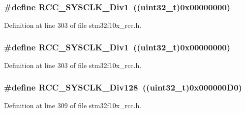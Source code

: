 \subsubsection[{\texorpdfstring{R\+C\+C\+\_\+\+S\+Y\+S\+C\+L\+K\+\_\+\+Div1}{RCC_SYSCLK_Div1}}]{\setlength{\rightskip}{0pt plus 5cm}\#define R\+C\+C\+\_\+\+S\+Y\+S\+C\+L\+K\+\_\+\+Div1~(({\bf uint32\+\_\+t})0x00000000)}\hypertarget{group___a_h_b__clock__source_gadc3ac37d90c2082d640e5948fac0878f}{}\label{group___a_h_b__clock__source_gadc3ac37d90c2082d640e5948fac0878f}


Definition at line 303 of file stm32f10x\+\_\+rcc.\+h.

\subsubsection[{\texorpdfstring{R\+C\+C\+\_\+\+S\+Y\+S\+C\+L\+K\+\_\+\+Div1}{RCC_SYSCLK_Div1}}]{\setlength{\rightskip}{0pt plus 5cm}\#define R\+C\+C\+\_\+\+S\+Y\+S\+C\+L\+K\+\_\+\+Div1~(({\bf uint32\+\_\+t})0x00000000)}\hypertarget{group___a_h_b__clock__source_gadc3ac37d90c2082d640e5948fac0878f}{}\label{group___a_h_b__clock__source_gadc3ac37d90c2082d640e5948fac0878f}


Definition at line 303 of file stm32f10x\+\_\+rcc.\+h.

\subsubsection[{\texorpdfstring{R\+C\+C\+\_\+\+S\+Y\+S\+C\+L\+K\+\_\+\+Div128}{RCC_SYSCLK_Div128}}]{\setlength{\rightskip}{0pt plus 5cm}\#define R\+C\+C\+\_\+\+S\+Y\+S\+C\+L\+K\+\_\+\+Div128~(({\bf uint32\+\_\+t})0x000000\+D0)}\hypertarget{group___a_h_b__clock__source_ga1a28926fcb86112058a365e01fe9a46b}{}\label{group___a_h_b__clock__source_ga1a28926fcb86112058a365e01fe9a46b}


Definition at line 309 of file stm32f10x\+\_\+rcc.\+h.

